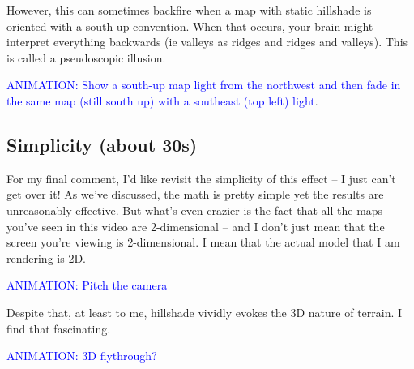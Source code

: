 \documentclass{article}
\newcommand\animation[1]{\textcolor{blue}{ANIMATION: #1}}
\begin{document}
However, this can sometimes backfire when a map with static hillshade is oriented with a south-up convention.
When that occurs, your brain might interpret everything backwards (ie valleys as ridges and ridges and valleys).
This is called a pseudoscopic illusion.

\animation{Show a south-up map light from the northwest and then fade in the same map (still south up) with a southeast (top left) light}.

\subsection{Simplicity (about 30s)}

For my final comment, I'd like revisit the simplicity of this effect -- I just can't get over it!
As we've discussed, the math is pretty simple yet the results are unreasonably effective.
But what's even crazier is the fact that all the maps you've seen in this video are 2-dimensional -- and I don't just mean that the screen you're viewing is 2-dimensional.
I mean that the actual model that I am rendering is 2D.

\animation{Pitch the camera}

Despite that, at least to me, hillshade vividly evokes the 3D nature of terrain.
I find that fascinating.

\animation{3D flythrough?}
\end{document}
